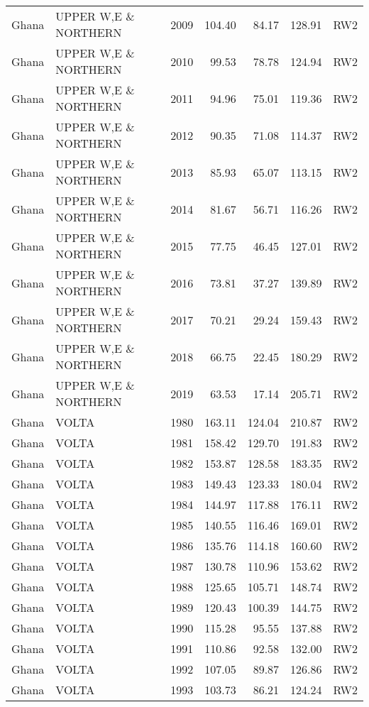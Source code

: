 \begin{longtable}{lllrrrl}
  Ghana & UPPER W,E \& NORTHERN & 2009 & 104.40 & 84.17 & 128.91 & RW2 \\ 
  Ghana & UPPER W,E \& NORTHERN & 2010 & 99.53 & 78.78 & 124.94 & RW2 \\ 
  Ghana & UPPER W,E \& NORTHERN & 2011 & 94.96 & 75.01 & 119.36 & RW2 \\ 
  Ghana & UPPER W,E \& NORTHERN & 2012 & 90.35 & 71.08 & 114.37 & RW2 \\ 
  Ghana & UPPER W,E \& NORTHERN & 2013 & 85.93 & 65.07 & 113.15 & RW2 \\ 
  Ghana & UPPER W,E \& NORTHERN & 2014 & 81.67 & 56.71 & 116.26 & RW2 \\ 
  Ghana & UPPER W,E \& NORTHERN & 2015 & 77.75 & 46.45 & 127.01 & RW2 \\ 
  Ghana & UPPER W,E \& NORTHERN & 2016 & 73.81 & 37.27 & 139.89 & RW2 \\ 
  Ghana & UPPER W,E \& NORTHERN & 2017 & 70.21 & 29.24 & 159.43 & RW2 \\ 
  Ghana & UPPER W,E \& NORTHERN & 2018 & 66.75 & 22.45 & 180.29 & RW2 \\ 
  Ghana & UPPER W,E \& NORTHERN & 2019 & 63.53 & 17.14 & 205.71 & RW2 \\ 
  Ghana & VOLTA & 1980 & 163.11 & 124.04 & 210.87 & RW2 \\ 
  Ghana & VOLTA & 1981 & 158.42 & 129.70 & 191.83 & RW2 \\ 
  Ghana & VOLTA & 1982 & 153.87 & 128.58 & 183.35 & RW2 \\ 
  Ghana & VOLTA & 1983 & 149.43 & 123.33 & 180.04 & RW2 \\ 
  Ghana & VOLTA & 1984 & 144.97 & 117.88 & 176.11 & RW2 \\ 
  Ghana & VOLTA & 1985 & 140.55 & 116.46 & 169.01 & RW2 \\ 
  Ghana & VOLTA & 1986 & 135.76 & 114.18 & 160.60 & RW2 \\ 
  Ghana & VOLTA & 1987 & 130.78 & 110.96 & 153.62 & RW2 \\ 
  Ghana & VOLTA & 1988 & 125.65 & 105.71 & 148.74 & RW2 \\ 
  Ghana & VOLTA & 1989 & 120.43 & 100.39 & 144.75 & RW2 \\ 
  Ghana & VOLTA & 1990 & 115.28 & 95.55 & 137.88 & RW2 \\ 
  Ghana & VOLTA & 1991 & 110.86 & 92.58 & 132.00 & RW2 \\ 
  Ghana & VOLTA & 1992 & 107.05 & 89.87 & 126.86 & RW2 \\ 
  Ghana & VOLTA & 1993 & 103.73 & 86.21 & 124.24 & RW2 \\ 

\end{longtable}
